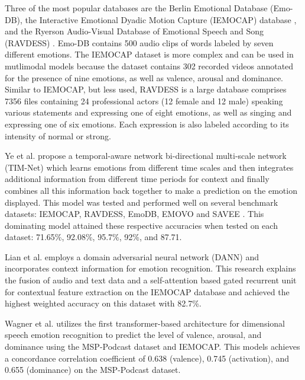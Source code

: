     Three of the most popular databases are the Berlin Emotional Database \cite{noauthor_emo-db_nodate} (Emo-DB), the Interactive Emotional Dyadic Motion Capture (IEMOCAP) database \cite{busso_iemocap_2008}, and the Ryerson Audio-Visual Database of Emotional Speech and Song (RAVDESS) \cite{livingstone_ryerson_2018}. Emo-DB contains 500 audio clips of words labeled by seven different emotions. The IEMOCAP dataset is more complex and can be used in mutlimodal models because the dataset contains 302 recorded videos annotated for the presence of nine emotions, as well as valence, arousal and dominance. Similar to IEMOCAP, but less used, RAVDESS is a large database comprises 7356 files containing 24 professional actors (12 female and 12 male) speaking various statements and expressing one of eight emotions, as well as singing and expressing one of six emotions. Each expression is also labeled according to its intensity of normal or strong.

    Ye et al. \cite{ye_temporal_2022} propose a temporal-aware network bi-directional multi-scale network (TIM-Net) which learns emotions from different time scales and then integrates additional information from different time periods for context and finally combines all this information back together to make a prediction on the emotion displayed. This model was tested and performed well on several benchmark datasets: IEMOCAP, RAVDESS, EmoDB, EMOVO \cite{costantini2014emovo} and SAVEE \cite{jackson}. This dominating model attained these respective accuracies when tested on each dataset: 71.65\%, 92.08\%, 95.7\%, 92\%, and 87.71.   

    Lian et al. \cite{lian-2020} employs a domain adversarial neural network (DANN) and incorporates context information for emotion recognition. This research explains the fusion of audio and text data and a self-attention based gated recurrent unit for contextual feature extraction on the IEMOCAP database and achieved the highest weighted accuracy on this dataset with 82.7\%.

    Wagner et al. \cite{wagner-2022} utilizes the first transformer-based architecture for dimensional speech emotion recognition to predict the level of valence, arousal, and dominance using the MSP-Podcast dataset \cite{martinez} and IEMOCAP. This models achieves a concordance correlation coefficient of 0.638 (valence), 0.745 (activation), and 0.655 (dominance) on the MSP-Podcast dataset.

